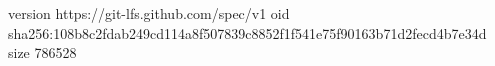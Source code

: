 version https://git-lfs.github.com/spec/v1
oid sha256:108b8c2fdab249cd114a8f507839c8852f1f541e75f90163b71d2fecd4b7e34d
size 786528
